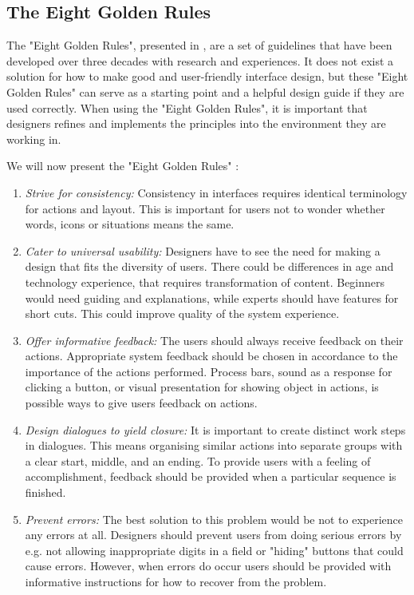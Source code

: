 \subsection{The Eight Golden Rules}
\label{subsec:golden}
The "Eight Golden Rules", presented in \cite{mmi}, are a set of guidelines that have been developed over three decades with research and experiences. It does not exist a solution for how to make good and user-friendly interface design, but these "Eight Golden Rules" can serve as a starting point and a helpful design guide if they are used correctly. When using the "Eight Golden Rules", it is important that designers refines and implements the principles into the environment they are working in. 

We will now present the "Eight Golden Rules" \cite{mmi}:

\begin{enumerate} 
\item \emph{Strive for consistency:} Consistency in interfaces requires identical terminology for actions and layout. This is important for users not to wonder whether words, icons or situations means the same. 
\item \emph{Cater to universal usability:} Designers have to see the need for making a design that fits the diversity of users. There could be differences in age and technology experience, that requires transformation of content. Beginners would need guiding and explanations, while experts should have features for short cuts. This could improve quality of the system experience. 
\item \emph{Offer informative feedback:} The users should always receive feedback on their actions. Appropriate system feedback should be chosen in accordance to the importance of the actions performed. Process bars, sound as a response for clicking a button, or visual presentation for showing object in actions, is possible ways to give users feedback on actions.  
\item \emph{Design dialogues to yield closure:} It is important to create distinct work steps in dialogues. This means organising similar actions into separate groups with a clear start, middle, and an ending. To provide users with a feeling of accomplishment, feedback should be provided when a particular sequence is finished.     
\item \emph{Prevent errors:} The best solution to this problem would be not to experience any errors at all. Designers should prevent users from doing serious errors by e.g. not allowing inappropriate digits in a field or "hiding" buttons that could cause errors. However, when errors do occur users should be provided with informative instructions for how to recover from the problem.   

\end{enumerate}
